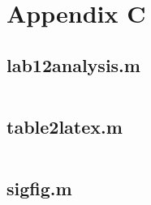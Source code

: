 \chapter{Appendix C} \label{cp:scripts}

\section{lab12analysis.m} 

\inputminted{matlab}{Code/lab12analysis.m} \label{listing:data_analysis_script}

\section{table2latex.m}

\inputminted{matlab}{Code/table2latex.m} \label{listing:table2latex_script}

\section{sigfig.m}

\inputminted{matlab}{Code/sigfig.m} \label{listing:sigfig_script}